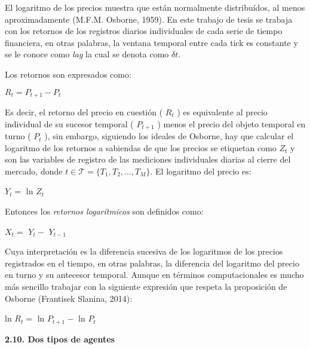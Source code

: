 El logaritmo de los precios muestra que están normalmente distribuídos, al menos aproximadamente (M.F.M. Osborne, 1959). En este trabajo de tesis se trabaja con los retornos de los registros diarios individuales de cada serie de tiempo financiera, en otras palabras, la ventana temporal entre cada \guillemotleft tick \guillemotright es constante y se le conoce como \textit{lag} la cual se denota como $\delta t$. 
\newline

Los retornos son expresados como:
\begin{center}
$R_t=P_{t+1}-P_t$
\end{center}
Es decir, el retorno del precio en cuestión ( $R_t$ ) es equivalente al precio individual de su sucesor temporal ( $P_{t+1}$ ) menos el precio del objeto temporal en turno ( $P_t$ ), sin embargo, siguiendo los ideales de Osborne, hay que calcular el logaritmo de los retornos a sabiendas de que los precios se etiquetan como $\mathit{Z_t}$ y son las variables de registro de las mediciones individuales diarias al cierre del mercado, donde \newline $t \in \mathcal{T} = \{\mathit{T_1,T_2,\ldots , T_M}\}$. El logaritmo del precio es:

\begin{center}
$\mathit{Y_{t}} = $ ln $\mathit{Z_{t}}$
\end{center}

Entonces los \textit{retornos logarítmicos} son definidos como: 

\begin{center}
$X_t = $ $\mathit{Y_{t}} - $  $\mathit{Y_{t - 1}}$
\end{center}

Cuya interpretación es la diferencia sucesiva de los logaritmos de los precios  registrados en el tiempo, en otras palabras, la diferencia del logaritmo del precio en turno y su antecesor temporal. Aunque en términos computacionales es mucho más sencillo trabajar con la siguiente expresión que respeta la proposición de Osborne (Frantisek Slanina, 2014): 
\begin{center}
ln $R_t = $ ln $\mathit{P_{t+1}} - $ ln $\mathit{P_{t}}$
\end{center}%

\vspace{0.5cm}
\vspace{0.5cm}
{
\noindent
\Large  \textbf{2.10. Dos tipos de agentes} 
}
\newline


